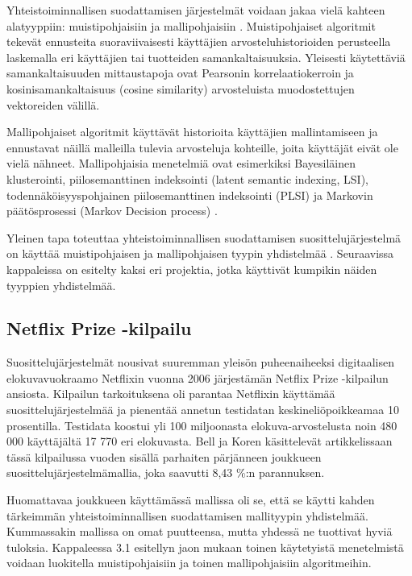 \documentclass[12pt,finnish]{tktltiki2}
\theoremstyle{definition}
\theoremstyle{remark}
\begin{document}
         Yhteistoiminnallisen suodattamisen järjestelmät voidaan jakaa vielä kahteen alatyyppiin: muistipohjaisiin ja mallipohjaisiin \cite{Das:2007:GNP:1242572.1242610}. Muistipohjaiset algoritmit tekevät ennusteita suoraviivaisesti käyttäjien arvosteluhistorioiden perusteella laskemalla eri käyttäjien tai tuotteiden samankaltaisuuksia. Yleisesti käytettäviä samankaltaisuuden mittaustapoja ovat Pearsonin korrelaatiokerroin ja kosinisamankaltaisuus (cosine similarity) arvosteluista muodostettujen vektoreiden välillä.
         
Mallipohjaiset algoritmit käyttävät historioita käyttäjien mallintamiseen ja ennustavat näillä malleilla tulevia arvosteluja kohteille, joita käyttäjät eivät ole vielä nähneet. Mallipohjaisia menetelmiä ovat esimerkiksi Bayesiläinen klusterointi, piilosemanttinen indeksointi (latent semantic indexing, LSI), todennäköisyyspohjainen piilosemanttinen indeksointi (PLSI) ja Markovin päätösprosessi (Markov Decision process) \cite{Das:2007:GNP:1242572.1242610}.
        
Yleinen tapa toteuttaa yhteistoiminnallisen suodattamisen suosittelujärjestelmä on käyttää muistipohjaisen ja mallipohjaisen tyypin yhdistelmää \cite{Burke:2002:HRS:586321.586352}. Seuraavissa kappaleissa on esitelty kaksi eri projektia, jotka käyttivät kumpikin näiden tyyppien yhdistelmää.

\subsection{Netflix Prize -kilpailu}

        Suosittelujärjestelmät nousivat suuremman yleisön puheenaiheeksi digitaalisen elokuvavuokraamo Netflixin vuonna 2006 järjestämän Netflix Prize -kilpailun ansiosta. Kilpailun tarkoituksena oli parantaa Netflixin käyttämää suosittelujärjestelmää ja pienentää annetun testidatan keskineliöpoikkeamaa 10 prosentilla. Testidata koostui yli 100 miljoonasta elokuva-arvostelusta noin 480 000 käyttäjältä 17 770 eri elokuvasta. Bell ja Koren käsittelevät artikkelissaan \cite{Bell:2007:LNP:1345448.1345465} tässä kilpailussa vuoden sisällä parhaiten pärjänneen joukkueen suosittelujärjestelmämallia, joka saavutti 8,43 \%:n parannuksen.
        
        Huomattavaa joukkueen käyttämässä mallissa oli se, että se käytti kahden tärkeimmän yhteistoiminnallisen suodattamisen mallityypin yhdistelmää. Kummassakin mallissa on omat puutteensa, mutta yhdessä ne tuottivat hyviä tuloksia. Kappaleessa 3.1 esitellyn jaon mukaan toinen käytetyistä menetelmistä voidaan luokitella muistipohjaisiin ja toinen mallipohjaisiin algoritmeihin.
        
\end{document}

